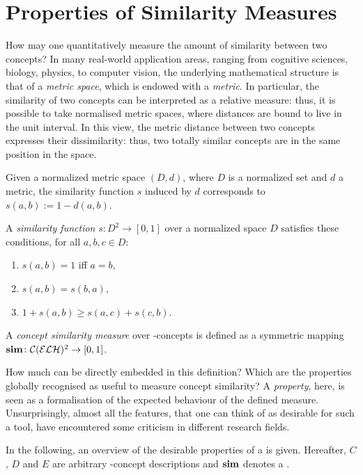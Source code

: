 \section{Properties of Similarity Measures}
\label{sec:properties}
How may one quantitatively measure the amount of similarity between two concepts?
In many real-world application areas, ranging from cognitive sciences, biology, physics, to computer vision, the underlying mathematical structure is that of a \emph{metric space}, which is endowed with a \emph{metric}.
In particular, the similarity of two concepts can be interpreted as a relative measure: thus, it is possible to take normalised metric spaces, where distances are bound to live in the unit interval.
In this view, the metric distance between two concepts expresses their dissimilarity: thus, two totally similar concepts are in the same position in the space.

\begin{definition}
  \label{dfn:sim}
  Given a normalized metric space \((D,d)\), where \(D\) is a normalized set and \(d\) a metric, the similarity function \(s\) induced by \(d\) corresponds to \(s(a,b) := 1 - d(a,b)\).

  A \emph{similarity function} \(s \colon D^2 \to [0,1]\) over a normalized space \(D\) satisfies these conditions, for all \(a,b,c \in D\):
  \begin{enumerate}
    \item \(s(a,b) = 1\) iff \(a = b\),
    \item \(s(a,b) = s(b,a)\),
    \item \(1 + s(a,b) \ge s(a,c) + s(c,b)\).
  \end{enumerate}
  A \emph{concept similarity measure} over \elh-concepts is defined as a symmetric mapping \(\operatorname{\mathbf{sim}} \colon \mathcal{C}(\mathcal{ELH})^2 \to [0,1]\).
\end{definition}

  How much can be directly embedded in this definition?
  Which are the properties globally recognised as useful to measure concept similarity?
  A \emph{property}, here, is seen as a formalisation of the expected behaviour of the defined measure.
  Unsurprisingly, almost all the features, that one can think of as desirable for such a tool, have encountered some criticism in different research fields.

  In the following, an overview of the desirable properties of a \csm is given. Hereafter, \(C\), \(D\) and \(E\) are arbitrary \elh-concept descriptions and \(\operatorname{\mathbf{sim}}\) denotes a \csm.


